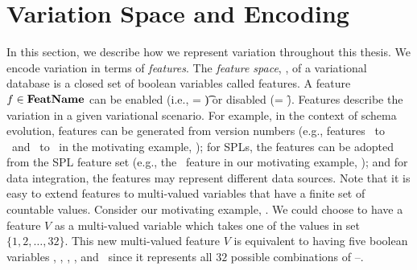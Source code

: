 \section{Variation Space and Encoding}
\label{sec:encode-var}




In this section, we describe how we represent variation throughout this 
thesis. 
We encode variation in terms of \emph{features}.
%
The \emph{feature space}, \fSet, of a variational database
is a closed set of boolean variables called features.
%
A feature \ensuremath{\fName \in \fSet} can be enabled (i.e., \fName = \t) or disabled (\fName = \f).
Features describe the variation in a given variational scenario.
%
%
For example, in the context of schema evolution, features can be generated from version 
numbers (e.g., features \vOne\ to \vFive\ and \tOne\ to \tFive\ in the 
motivating example, ); for SPLs, 
the features can be adopted from the SPL feature set (e.g., the \edu\ feature in
our motivating example, ); and 
for data integration, the features may represent different data sources.  
Note that it is easy to extend features
to multi-valued variables that have a finite set of countable values.
Consider our motivating example, . We could choose to have a feature $V$
as a multi-valued variable which takes one of the values in set $\{1, 2, \ldots, 32\}$. 
This new multi-valued feature $V$ is equivalent to having five boolean variables 
\vOne, \vTwo, \vThree, \vFour, and \vFive\ since it represents all $32$ possible
combinations of \vOne--\vFive.

